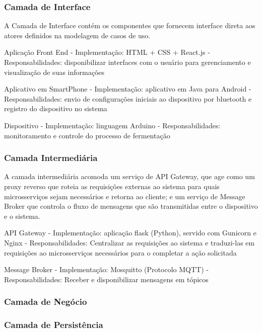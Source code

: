 
\subsubsection{Camada de Interface}
A Camada de Interface contém os componentes que fornecem interface direta aos atores definidos na modelagem de casos de uso. 

Aplicação Front End
    - Implementação: HTML + CSS + React.js
    - Responsabilidades: disponibilizar interfaces com o usuário para gerenciamento e visualização de suas informações

Aplicativo em SmartPhone
    - Implementação: aplicativo em Java para Android
    - Responsabilidades: envio de configurações iniciais ao dispositivo por bluetooth e registro do dispositivo no sistema

Dispositivo
    - Implementação: linguagem Arduino
    - Responsabilidades: monitoramento e controle do processo de fermentação

\subsubsection{Camada Intermediária}

    A camada intermediária acomoda um serviço de API Gateway, que age como um proxy reverso que roteia as requisições externas ao sistema para quais microsserviços sejam necessários e retorna ao cliente; e um serviço de Message Broker que controla o fluxo de mensagens que são transmitidas entre o dispositivo e o sistema.
    
    API Gateway
        - Implementação: aplicação flask (Python), servido com Gunicorn e Nginx
        - Responsabilidades: Centralizar as requisições ao sistema e traduzi-las em requisições ao microsserviços necessários para o completar a ação solicitada
    
    Message Broker
        - Implementação: Mosquitto (Protocolo MQTT)
        - Responsabilidades: Receber e disponibilizar mensagens em tópicos
    
\subsubsection{Camada de Negócio}
    
\subsubsection{Camada de Persistência}

